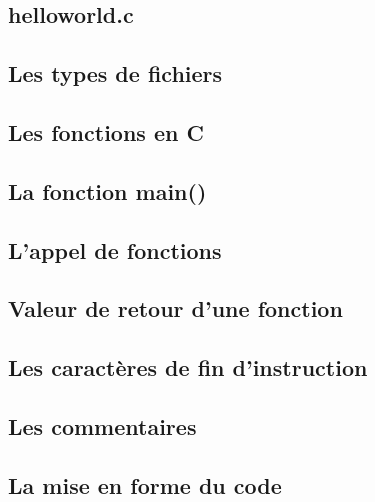 \subsection*{helloworld.c}



\subsection*{Les types de fichiers}



\subsection*{Les fonctions en C}









\subsection*{La fonction main()}



\subsection*{L'appel de fonctions}











\subsection*{Valeur de retour d'une fonction}











\subsection*{Les caractères de fin d'instruction}



\subsection*{Les commentaires}











\subsection*{La mise en forme du code}




